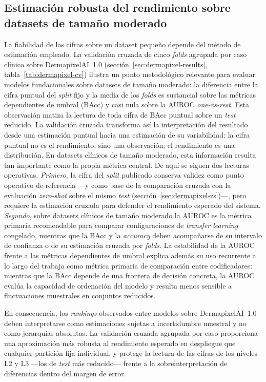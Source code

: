 \subsection{Estimación robusta del rendimiento sobre datasets de tamaño moderado}
\label{sec:disc-cv-robustez}

La fiabilidad de las cifras sobre un dataset pequeño depende del método de
estimación empleado. La validación cruzada de cinco \emph{folds} agrupada
por caso clínico sobre DermapixelAI~1.0
(sección~\ref{sec:dermapixel-results}, tabla~\ref{tab:dermapixel-cv})
ilustra un punto metodológico relevante para evaluar modelos
fundacionales sobre datasets de tamaño moderado: la diferencia entre la
cifra puntual del \emph{split} fijo y la media de los \emph{folds} es
sustancial sobre las métricas dependientes de umbral (BAcc) y casi nula
sobre la AUROC \emph{one-vs-rest}. Esta observación matiza la lectura de
toda cifra de BAcc puntual sobre un \emph{test} reducido. La validación
cruzada transforma así la interpretación del resultado desde una
estimación puntual hacia una estimación de su variabilidad: la cifra
puntual no es el rendimiento, sino una observación; el rendimiento es una
distribución. En datasets clínicos de tamaño moderado, esta información
resulta tan importante como la propia métrica central. De aquí se siguen
dos lecturas operativas. \textit{Primero}, la cifra del \emph{split}
publicado conserva validez como punto operativo de referencia ---y como
base de la comparación cruzada con la evaluación \emph{zero-shot} sobre el
mismo \emph{test} (sección~\ref{sec:dermapixel-zs})---, pero requiere la
estimación cruzada para defender el rendimiento esperado del sistema.
\textit{Segundo}, sobre datasets clínicos de tamaño moderado la AUROC es la
métrica primaria recomendable para comparar configuraciones de
\emph{transfer learning} congelado, mientras que la BAcc y la
\emph{accuracy} deben acompañarse de su intervalo de confianza o de su
estimación cruzada por \emph{folds}. La estabilidad de la AUROC frente a
las métricas dependientes de umbral explica además su uso recurrente a lo
largo del trabajo como métrica primaria de comparación entre
codificadores: mientras que la BAcc depende de una frontera de decisión
concreta, la AUROC evalúa la capacidad de ordenación del modelo y resulta
menos sensible a fluctuaciones muestrales en conjuntos reducidos.

En consecuencia, los \emph{rankings} observados entre modelos sobre
DermapixelAI~1.0 deben interpretarse como estimaciones sujetas a
incertidumbre muestral y no como jerarquías absolutas. La validación
cruzada agrupada por caso proporciona una aproximación más robusta al
rendimiento esperado en despliegue que cualquier partición fija
individual, y protege la lectura de las cifras de los niveles L2 y L3
---los de \emph{test} más reducido--- frente a la sobreinterpretación de
diferencias dentro del margen de error.

